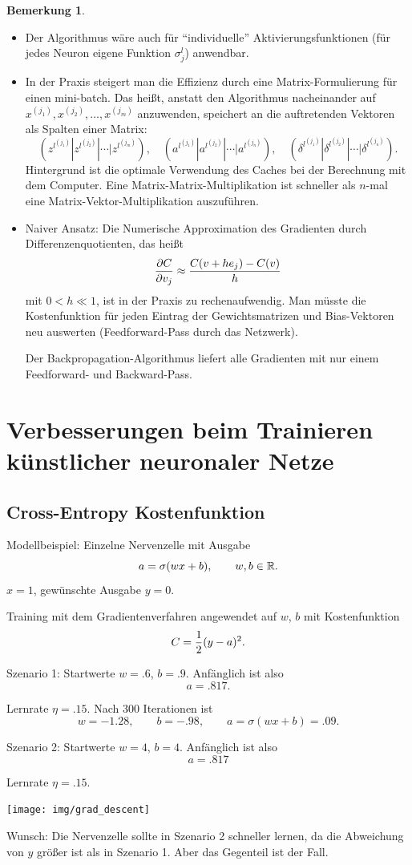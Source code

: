 \documentclass[
 a4paper,
 12pt,
 parskip=half
 ]{scrreprt}
\theoremstyle{plain}
\theoremstyle{definition}
\newtheorem*{rmrk*}{Bemerkung}
\begin{document}
\begin{rmrk*}
  \begin{itemize}
  \item Der Algorithmus wäre auch für ``individuelle'' Aktivierungsfunktionen
    (für jedes Neuron eigene Funktion $\sigma_j^l$) anwendbar.
  \item In der Praxis steigert man die Effizienz durch eine Matrix-Formulierung
    für einen mini-batch. Das heißt, anstatt den Algorithmus nacheinander auf
    $x^{(j_1)}, x^{(j_2)}, \ldots, x^{(j_m)}$ anzuwenden, speichert an die
    auftretenden Vektoren als Spalten einer Matrix:
    \[ ( z^{l^{(j_1)}} | z^{l^{(j_2)}} | \cdots | z^{l^{(j_m)}}), \quad
      ( a^{l^{(j_1)}} | a^{l^{(j_2)}} | \cdots | a^{l^{(j_n)}}), \quad
      ( \delta^{l^{(j_1)}} | \delta^{l^{(j_2)}} | \cdots |
      \delta^{l^{(j_n)}}). \]
    Hintergrund ist die optimale Verwendung des Caches bei der Berechnung mit
    dem Computer. Eine Matrix-Matrix-Multiplikation ist schneller als $n$-mal
    eine Matrix-Vektor-Multiplikation auszuführen.
  \item Naiver Ansatz: Die Numerische Approximation des Gradienten durch 
    Differenzenquotienten, das heißt
    \[ \frac{\partial C}{\partial v_j} \approx \frac{C(v+h e_j) - C(v)}{h} \]
    mit $0 < h \ll 1$, ist in der Praxis zu rechenaufwendig. Man müsste die
    Kostenfunktion für jeden Eintrag der Gewichtsmatrizen und Bias-Vektoren neu
    auswerten (Feedforward-Pass durch das Netzwerk).

    Der Backpropagation-Algorithmus liefert alle Gradienten mit nur einem
    Feedforward- und Backward-Pass.
  \end{itemize}
\end{rmrk*}

\section{Verbesserungen beim Trainieren künstlicher
  neuronaler Netze}
\subsection{Cross-Entropy Kostenfunktion}
Modellbeispiel: Einzelne Nervenzelle mit Ausgabe
\[ a = \sigma( wx + b ), \qquad w,b \in \mathbb{R}. \]
$x=1$, gewünschte Ausgabe $y=0$.

Training mit dem Gradientenverfahren angewendet auf $w$, $b$ mit Kostenfunktion
\[ C= \frac{1}{2} (y-a)^2. \]

Szenario 1: Startwerte $w = \num{.6}$, $b = \num{.9}$. Anfänglich ist also
\[ a = \num{.817}. \]

Lernrate $\eta = \num{.15}$. Nach 300 Iterationen ist
\[ w = \num{-1.28}, \qquad b = \num{-.98}, \qquad a = \sigma(wx + b) =
  \num{.09}. \]

Szenario 2: Startwerte $w = 4$, $b = 4$. Anfänglich ist also
\[ a = \num{.817} \]

Lernrate $\eta = \num{.15}$.

\begin{center}
  \texttt{[image: img/grad\_descent]}
\end{center}

Wunsch: Die Nervenzelle sollte in Szenario 2 schneller lernen, da die Abweichung
von $y$ größer ist als in Szenario 1. Aber das Gegenteil ist der Fall.
\end{document}
